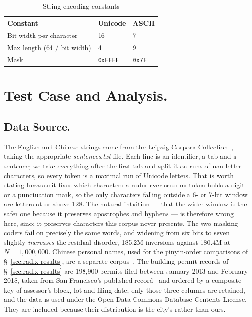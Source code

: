 \documentclass[twoside,leqno,twocolumn]{article}
\begin{document}
\begin{table}
  \caption{String-encoding constants}
  \label{tab:EncodingConstants}
  \centering
  \begin{tabular}{lll}
    \toprule
    Constant & Unicode & ASCII \\
    \midrule
    Bit width per character & 16 & 7 \\
    Max length (64 / bit width) & 4 & 9 \\
    Mask & \texttt{0xFFFF} & \texttt{0x7F} \\
    \bottomrule
  \end{tabular}
\end{table}

\section{Test Case and Analysis.}

\subsection{Data Source.}
\label{sec:data-source}
The English and Chinese strings come from the Leipzig Corpora Collection~\cite{GOLDHAHN12.327},
taking the appropriate \emph{sentences.txt} file.
Each line is an identifier, a tab and a sentence; we take everything after the first tab and split it
on runs of non-letter characters, so every token is a maximal run of Unicode letters.
That is worth stating because it fixes which characters a coder ever sees: no token holds a digit or a
punctuation mark, so the only characters falling outside a 6- or 7-bit window are letters at or above
128.
The natural intuition --- that the wider window is the safer one because it preserves apostrophes and
hyphens --- is therefore wrong here, since it preserves characters this corpus never presents.
The two masking coders fail on precisely the same words, and widening from six bits to seven slightly
\emph{increases} the residual disorder, 185.2M inversions against 180.4M at $N = 1{,}000{,}000$.
Chinese personal names, used for the pinyin-order comparisons of \S~\ref{sec:radix-results}, are a
separate corpus~\cite{wainshine2020chinesenames}.
The building-permit records of \S~\ref{sec:radix-results} are 198,900 permits filed between January
2013 and February 2018, taken from San Francisco's published record~\cite{sf-building-permits} and
ordered by a composite key of assessor's block, lot and filing date; only those three columns are
retained, and the data is used under the Open Data Commons Database Contents License.
They are included because their distribution is the city's rather than ours.
\end{document}
